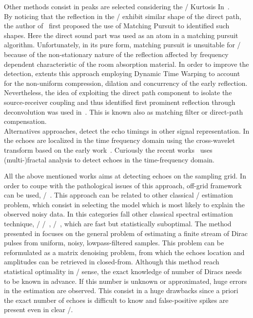 Other methods consist in peaks are selected considering the \RIR/ Kurtosis In~.
\\By noticing that the reflection in the \RIRs/ exhibit similar shape of the direct path, the author of~ first proposed the use of Matching Pursuit to identified such shapes.
Here the direct sound part was used as an atom in a matching pursuit algorithm.
Unfortunately, in its pure form, matching pursuit is unsuitable for \RIRs/ because of the non-stationary nature of the reflection affected by frequency dependent characteristic of the room absorption material.
In order to improve the detection,  extents this approach employing Dynamic Time Warping to account for the non-uniform compression, dilation and concurrency of the early reflection.
Nevertheless, the idea of exploiting the direct path component to isolate the source-receiver coupling and thus identified first prominent reflection through deconvolution was used in~.
This is known also as matching filter or direct-path compensation.
\\Alternatives approaches, detect the echo timings in other signal representation.
In   the echoes are localized in the time frequency domain using the cross-wavelet transform based on the early work~.
Curiously the recent works~ uses (multi-)fractal analysis to detect echoes in the time-frequency domain.

\mynewline
All the above mentioned works aims at detecting echoes on the sampling grid.
In order to coupe with the pathological issues of this approach, off-grid framework can be used, \eg/~.
This approach can be related to other classical \ML/ estimation problem, which consist in selecting the model which is most likely to explain the observed noisy data.
In this categories fall other classical spectral estimation technique, \eg/ \MUSIC/~, \ESPRIT/~, which are fast but statistically suboptimal.
The method presented in  focuses on the general problem of estimating a finite stream of Dirac pulses from uniform, noisy, lowpass-filtered samples.
This problem can be reformulated as a matrix denoising problem, from which the echoes location and amplitudes can be retrieved in closed-from.
Although this method reach statistical optimality in \ML/ sense, the exact knowledge of number of Diracs needs to be known in advance.
If this number is unknown or approximated, huge errors in the estimation are observed.
This consist in a huge drawbacks since a priori the exact number of echoes is difficult to know and false-positive spikes are present even in clear \RIRs/.

